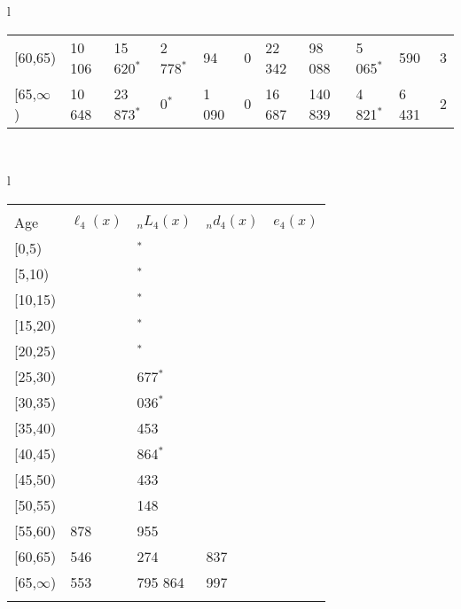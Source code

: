 \documentclass[
]{article}
\begin{document}
\begin{table}
\begin{tabular}[t]{l}
\begin{tabular}
{}[60,65) & 10 106 & 15 620$^{*}$ & 2 778$^{*}$ & 94 & 0 & 22 342 & 98 088 & 5 065$^{*}$ & 590 & 3\\
{}[65,$\infty$) & 10 648 & 23 873$^{*}$ & 0$^{*}$ & 1 090 & 0 & 16 687 & 140 839 & 4 821$^{*}$ & 6 431 & 2\\
\end{tabular}\\
\end{tabular}
\centering
\begin{tabular}[t]{l}
\hline
\begin{tabular}{>{\raggedright\arraybackslash}p{.43in}>{\raggedleft\arraybackslash}p{1.3in}>{\raggedleft\arraybackslash}p{1.3in}>{\raggedleft\arraybackslash}p{1.3in}>{\raggedleft\arraybackslash}p{1.3in}}
\toprule
\multicolumn{1}{c}{ } & \multicolumn{4}{c}{(4) Lost both} \\
\cmidrule(l{3pt}r{3pt}){2-5}
Age & $\ell_{4}(x)$ & ${}_nL_{4}(x)$ & ${}_nd_{4}(x)$ & $e_{4}(x)$\\
\midrule
{}[0,5) & 0 & 0$^{*}$ & 0 & 25\\
{}[5,10) & 0 & 0$^{*}$ & 0 & 25\\
{}[10,15) & 0 & 0$^{*}$ & 0 & 25\\
{}[15,20) & 0 & 0$^{*}$ & 0 & 25\\
{}[20,25) & 0 & 0$^{*}$ & 0 & 25\\
\addlinespace
{}[25,30) & 0 & 1 677$^{*}$ & 1 & 25\\
{}[30,35) & -1 & 7 036$^{*}$ & 4 & 25\\
{}[35,40) & -5 & 17 453 & 12 & 25\\
{}[40,45) & -17 & 13 864$^{*}$ & 14 & 25\\
{}[45,50) & -31 & 49 433 & 78 & 25\\
\addlinespace
{}[50,55) & -109 & 116 148 & 296 & 24\\
{}[55,60) & 13 878 & 145 955 & 551 & 23\\
{}[60,65) & 20 546 & 305 274 & 1 837 & 22\\
{}[65,$\infty$) & 26 553 & 1 795 864 & 81 997 & 20\\
\bottomrule
\multicolumn{5}{l}{\rule{0pt}{1em}\textsuperscript{*} Based on an estimated from SIPP with less than 10 respondents in the numerator.}\\
\end{tabular}\\
\end{tabular}
\end{table}
\end{document}
